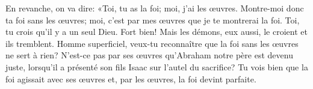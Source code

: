 En revanche, on va dire:
	«Toi, tu as la foi; moi, j’ai les œuvres.
Montre-moi donc ta foi sans les œuvres;
	moi, c’est par mes œuvres que je te montrerai la foi.
Toi, tu crois qu’il y a un seul Dieu. Fort bien!
	Mais les démons, eux aussi, le croient et ils tremblent.
Homme superficiel,
	veux-tu reconnaître que la foi sans les œuvres ne sert à rien?
N’est-ce pas par ses œuvres qu’Abraham notre père est devenu juste,
	lorsqu’il a présenté son fils Isaac sur l’autel du sacrifice?
Tu vois bien que la foi agissait avec ses œuvres
	et, par les œuvres, la foi devint parfaite.

